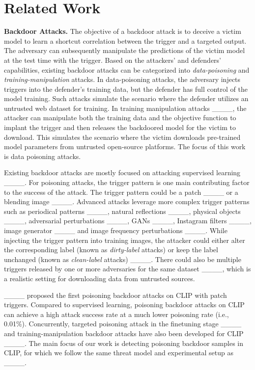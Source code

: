 \section{Related Work}
\noindent\textbf{Backdoor Attacks.} The objective of a backdoor attack is to deceive a victim model to learn a shortcut correlation between the trigger and a targeted output. The adversary can subsequently manipulate the predictions of the victim model at the test time with the trigger. 
Based on the attackers' and defenders' capabilities, existing backdoor attacks can be categorized into \emph{data-poisoning} and \emph{training-manipulation} attacks. 
In data-poisoning attacks, the adversary injects triggers into the defender's training data, but the defender has full control of the model training. Such attacks simulate the scenario where the defender utilizes an untrusted web dataset for training.
In training manipulation attacks ____, the attacker can manipulate both the training data and the objective function to implant the trigger and then
releases the backdoored model for the victim to download. This simulates the scenario where the victim downloads pre-trained model parameters from untrusted open-source platforms. 
The focus of this work is data poisoning attacks. 

Existing backdoor attacks are mostly focused on attacking supervised learning ____. 
For poisoning attacks, the trigger pattern is one main contributing factor to the success of the attack. The trigger pattern could be a patch ____ or a blending image ____. Advanced attacks leverage more complex trigger patterns such as periodical patterns ____, natural reflections ____, physical objects ____, adversarial perturbations ____, GANs ____, Instagram filters ____, image generator ____ and image frequency perturbations ____. 
While injecting the trigger pattern into training images, the attacker could either alter the corresponding label (known as {\em dirty-label} attacks) or keep the label unchanged (known as {\em clean-label} attacks) ____.
There could also be multiple triggers released by one or more adversaries for the same dataset ____, which is a realistic setting for downloading data from untrusted sources. 

____ proposed the first poisoning backdoor attacks on CLIP with patch triggers.
Compared to supervised learning, poisoning backdoor attacks on CLIP can achieve a high attack success rate at a much lower poisoning rate (i.e., 0.01\%). 
Concurrently, targeted poisoning attack in the finetuning stage ____ and training-manipulation backdoor attacks have also been developed for CLIP ____.
The main focus of our work is detecting poisoning backdoor samples in CLIP, for which we follow the same threat model and experimental setup as ____.


